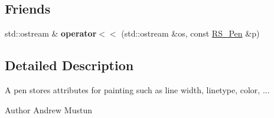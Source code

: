 \subsection*{Friends}
\begin{DoxyCompactItemize}
\item 
\hypertarget{classRS__Pen_a7ea20de3fa31120ba9fd33c26910e187}{std\-::ostream \& {\bfseries operator$<$$<$} (std\-::ostream \&os, const \hyperlink{classRS__Pen}{R\-S\-\_\-\-Pen} \&p)}\label{classRS__Pen_a7ea20de3fa31120ba9fd33c26910e187}

\end{DoxyCompactItemize}


\subsection{Detailed Description}
A pen stores attributes for painting such as line width, linetype, color, ...

\begin{DoxyAuthor}{Author}
Andrew Mustun 
\end{DoxyAuthor}


